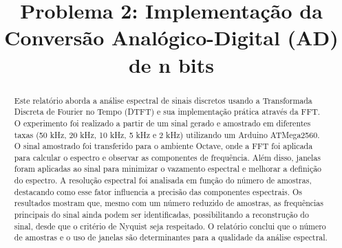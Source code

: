 \documentclass[conference]{IEEEtran}
\begin{document}
\makeatletter
\newcommand{\linebreakand}{%
    \end{@IEEEauthorhalign}
    \hfill\mbox{}\par
    \mbox{}\hfill\begin{@IEEEauthorhalign}
}
\makeatother

\title{Problema 2: Implementação da Conversão Analógico-Digital (AD) de n bits\\
}

\author{
    \and
    \IEEEauthorblockN{}
    \IEEEauthorblockA{}
}

\maketitle

\begin{abstract}
    Este relatório aborda a análise espectral de sinais discretos usando a Transformada Discreta de Fourier no Tempo (DTFT) e sua implementação prática através da FFT. O experimento foi realizado a partir de um sinal gerado e amostrado em diferentes taxas (50 kHz, 20 kHz, 10 kHz, 5 kHz e 2 kHz) utilizando um Arduino ATMega2560. O sinal amostrado foi transferido para o ambiente Octave, onde a FFT foi aplicada para calcular o espectro e observar as componentes de frequência. Além disso, janelas foram aplicadas ao sinal para minimizar o vazamento espectral e melhorar a definição do espectro. A resolução espectral foi analisada em função do número de amostras, destacando como esse fator influencia a precisão das componentes espectrais. Os resultados mostram que, mesmo com um número reduzido de amostras, as frequências principais do sinal ainda podem ser identificadas, possibilitando a reconstrução do sinal, desde que o critério de Nyquist seja respeitado. O relatório conclui que o número de amostras e o uso de janelas são determinantes para a qualidade da análise espectral.


\end{abstract}
\end{document}
